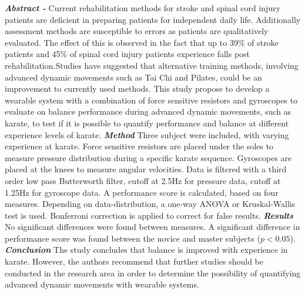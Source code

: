 \textbf{\textit{Abstract -}} Current rehabilitation methods for stroke and spinal cord injury patients are deficient in preparing patients for independent daily life. Additionally assessment methods are susceptible to errors as patients are qualitatively evaluated. The effect of this is observed in the fact that up to 39\% of stroke patients and 45\% of spinal cord injury patients experience falls post rehabilitation.Studies have suggested that alternative training methods, involving advanced dynamic movements such as Tai Chi and Pilates, could be an improvement to currently used methods. This study propose to develop a wearable system with a combination of force sensitive resistors and gyroscopes to evaluate on balance performance during advanced dynamic movements, such as karate, to test if it is possible to quantify performance and balance at different experience levels of karate. \textbf{\textit{Method}} Three subject were included, with varying experience at karate. Force sensitive resistors are placed under the soles to measure pressure distribution during a specific karate sequence. Gyroscopes are placed at the knees to measure angular velocities. Data is filtered with a third order low pass Butterworth filter, cutoff at 2.5Hz for pressure data, cutoff at 1.25Hz for gyroscope data. A performance score is calculated, based on four measures. Depending on data-distribution, a one-way ANOVA or Kruskal-Wallis test is used. Bonferroni correction is applied to correct for false results. \textbf{\textit{Results}} No significant differences were found between measures. A significant difference in performance score was found between the novice and master subjects ($p<0.05$).\\ \textbf{\textit{Conclusion}} The study concludes that balance is improved with experience in karate. However, the authors recommend that further studies should be conducted in the research area in order to determine the possibility of quantifying advanced dynamic movements with wearable systems.